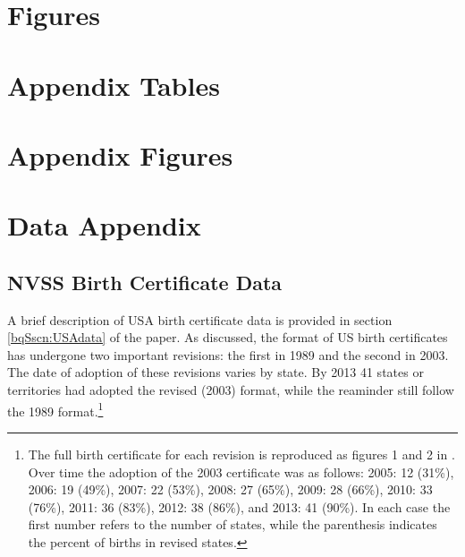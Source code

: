 \documentclass[a4paper, 11 pt]{article}
\theoremstyle{plain}
\begin{document}
\begin{spacing}{1.2}
\newpage
\section*{Figures}


\clearpage
\appendix
\section{Appendix Tables}


\clearpage
\appendix
\section{Appendix Figures}



\section{Data Appendix}
\label{bqScn:datApp}
\subsection{NVSS Birth Certificate Data}
A brief description of USA birth certificate data is provided in section 
\ref{bqSscn:USAdata} of the paper.  As discussed, the format of US birth
certificates has undergone two important revisions: the first in 1989
and the second in 2003.  The date of adoption of these revisions varies 
by state.  By 2013 41 states or territories had adopted the revised (2003)
format, while the reaminder still follow the 1989 format.\footnote{The full
birth certificate for each revision is reproduced as figures 1 and 2 in
\citet{MenackerMartin2005}.  Over time the adoption of the 2003 certificate 
was as follows: 2005: 12 (31\%), 2006: 19 (49\%), 2007: 22 (53\%), 2008: 27 
(65\%), 2009: 28 (66\%), 2010: 33 (76\%), 2011: 36 (83\%), 2012: 38 (86\%),
and 2013: 41 (90\%).  In each case the first number refers to the number
of states, while the parenthesis indicates the percent of births in revised
states.}


\end{spacing}
\end{document}
